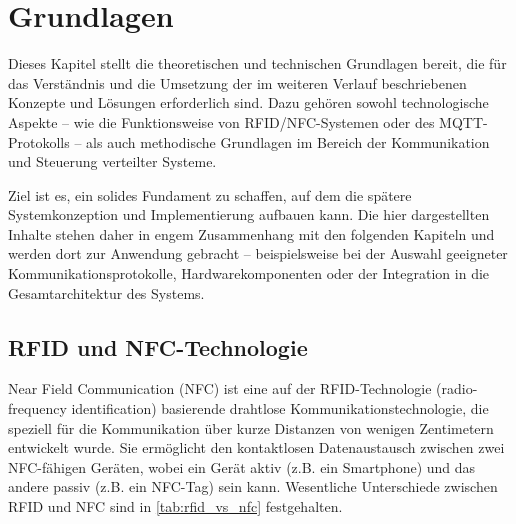 \chapter{Grundlagen}
\label{cha:Grundlagen}


Dieses Kapitel stellt die theoretischen und technischen Grundlagen bereit, die für das Verständnis und die Umsetzung der im weiteren Verlauf beschriebenen Konzepte und Lösungen erforderlich sind. Dazu gehören sowohl technologische Aspekte – wie die Funktionsweise von RFID/NFC-Systemen oder des MQTT-Protokolls – als auch methodische Grundlagen im Bereich der Kommunikation und Steuerung verteilter Systeme.

Ziel ist es, ein solides Fundament zu schaffen, auf dem die spätere Systemkonzeption und Implementierung aufbauen kann. Die hier dargestellten Inhalte stehen daher in engem Zusammenhang mit den folgenden Kapiteln und werden dort zur Anwendung gebracht – beispielsweise bei der Auswahl geeigneter Kommunikationsprotokolle, Hardwarekomponenten oder der Integration in die Gesamtarchitektur des Systems.

\section{RFID und NFC-Technologie}
\label{sec:nfc}

Near Field Communication (NFC) ist eine auf der RFID-Technologie (radio-frequency identification) basierende drahtlose Kommunikationstechnologie, die speziell für die Kommunikation über kurze Distanzen von wenigen Zentimetern entwickelt wurde. Sie ermöglicht den kontaktlosen Datenaustausch zwischen zwei NFC-fähigen Geräten, wobei ein Gerät aktiv (z.B. ein Smartphone) und das andere passiv (z.B. ein NFC-Tag) sein kann. Wesentliche Unterschiede zwischen RFID und NFC sind in \autoref{tab:rfid_vs_nfc} festgehalten. 

